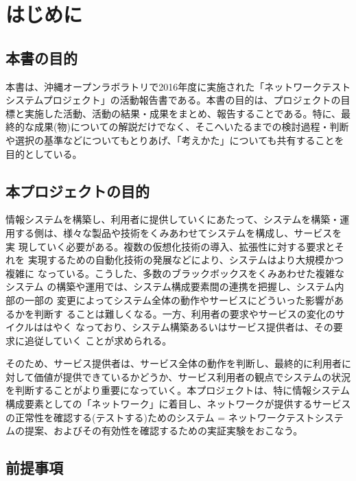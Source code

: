 
\chapter{はじめに}
\label{chap:abstract}

 \section{本書の目的}
 \label{sec:book-purpose}

本書は、沖縄オープンラボラトリで2016年度に実施された「ネットワークテスト
システムプロジェクト」の活動報告書である。本書の目的は、プロジェクトの目
標と実施した活動、活動の結果・成果をまとめ、報告することである。特に、最
終的な成果(物)についての解説だけでなく、そこへいたるまでの検討過程・判断
や選択の基準などについてもとりあげ、「考えかた」についても共有することを
目的としている。

 \section{本プロジェクトの目的}
 \label{sec:pj-purpose}


情報システムを構築し、利用者に提供していくにあたって、システムを構築・運
用する側は、様々な製品や技術をくみあわせてシステムを構成し、サービスを実
現していく必要がある。複数の仮想化技術の導入、拡張性に対する要求とそれを
実現するための自動化技術の発展などにより、システムはより大規模かつ複雑に
なっている。こうした、多数のブラックボックスをくみあわせた複雑なシステム
の構築や運用では、システム構成要素間の連携を把握し、システム内部の一部の
変更によってシステム全体の動作やサービスにどういった影響があるかを判断す
ることは難しくなる。一方、利用者の要求やサービスの変化のサイクルははやく
なっており、システム構築あるいはサービス提供者は、その要求に追従していく
ことが求められる。

そのため、サービス提供者は、サービス全体の動作を判断し、最終的に利用者に
対して価値が提供できているかどうか、サービス利用者の観点でシステムの状況
を判断することがより重要になっていく。本プロジェクトは、特に情報システム
構成要素としての「ネットワーク」に着目し、ネットワークが提供するサービス
の正常性を確認する(テストする)ためのシステム = ネットワークテストシステ
ムの提案、およびその有効性を確認するための実証実験をおこなう。

 \section{前提事項}
 \label{sec:premise}


